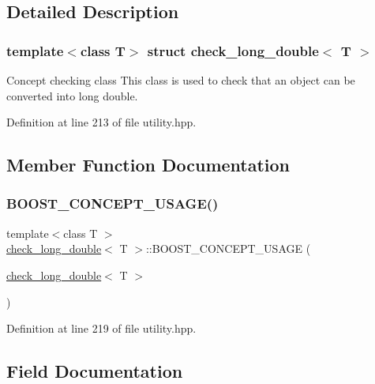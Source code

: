\subsection{Detailed Description}
\subsubsection*{template$<$class T$>$\newline
struct check\+\_\+long\+\_\+double$<$ T $>$}

Concept checking class This class is used to check that an object can be converted into long double. 

Definition at line 213 of file utility.\+hpp.



\subsection{Member Function Documentation}
\mbox{\label{structcheck__long__double_a4b9f82b6744a7c2dcc8e0380d2815a47}} 
\subsubsection{\texorpdfstring{B\+O\+O\+S\+T\+\_\+\+C\+O\+N\+C\+E\+P\+T\+\_\+\+U\+S\+A\+G\+E()}{BOOST\_CONCEPT\_USAGE()}}
{\footnotesize\ttfamily template$<$class T $>$ \\
\hyperlink{structcheck__long__double}{check\+\_\+long\+\_\+double}$<$ T $>$\+::B\+O\+O\+S\+T\+\_\+\+C\+O\+N\+C\+E\+P\+T\+\_\+\+U\+S\+A\+GE (\begin{DoxyParamCaption}\item[{\hyperlink{structcheck__long__double}{check\+\_\+long\+\_\+double}$<$ T $>$}]{ }\end{DoxyParamCaption})\hspace{0.3cm}{\ttfamily [inline]}}



Definition at line 219 of file utility.\+hpp.



\subsection{Field Documentation}
\mbox{\label{structcheck__long__double_a50d75a67431fd1169e6040354950c662}} 
